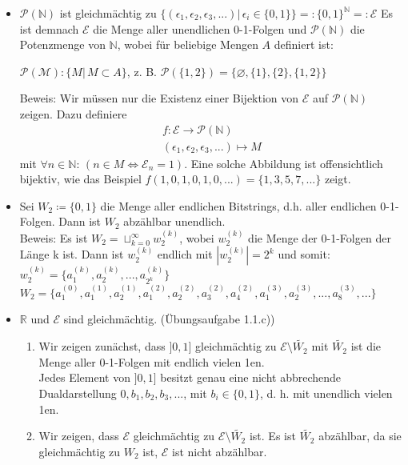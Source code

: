 \begin{itemize}[noitemsep]
\item $\mathcal{P(\mathbb{N})}$ ist gleichmächtig zu $\{(\epsilon_1, \epsilon_2, \epsilon_3, ...)| \, \epsilon_i \in \{0,1\}\} =: \{0,1\}^\mathbb{N} =: \mathcal{E}$
Es ist demnach $\mathcal{E}$ die Menge aller unendlichen 0-1-Folgen und $\mathcal{P(\mathbb{N})}$ die Potenzmenge von $\mathbb{N}$, wobei für beliebige Mengen $A$ definiert ist:
\begin{center}
	$\mathcal{P(M)}\colon \{M|\, M \subset A\}$, z. B. $\mathcal{P}( \{ 1, 2 \} ) = \{\varnothing, \{1\}, \{2\}, \{1,2\}\}$
\end{center}
Beweis: Wir müssen nur die Existenz einer Bijektion von $\mathcal{E}$ auf $\mathcal{P(\mathbb{N})}$ zeigen. Dazu definiere
\begin{equation*}
\begin{aligned}
	f: \mathcal{E} \to \mathcal{P(\mathbb{N})}\\
	(\epsilon_1, \epsilon_2, \epsilon_3, ...) \mapsto M
\end{aligned}
\end{equation*}
mit $\forall n \in \mathbb{N}: \, (n\in M \Leftrightarrow \mathcal{E}_n = 1)$. Eine solche Abbildung ist offensichtlich bijektiv, wie das Beispiel $f(1,0,1,0,1,0,...) = \{1,3,5,7,...\}$ zeigt. \proofend
\item Sei $W_2\coloneqq \{0,1\}$ die Menge aller endlichen Bitstrings, d.h. aller endlichen 0-1-Folgen. Dann ist $W_2$ abzählbar unendlich.\\
Beweis: Es ist $W_2 = \sqcup_{k=0}^\infty w_2^{(k)}$, wobei $w_2^{(k)}$ die Menge der 0-1-Folgen der Länge k ist. Dann ist $w_2^{(k)}$ endlich mit $|w_2^{(k)}|= 2^k$ und somit:\\
$w_2^{(k)} =\{a_1^{(k)}, a_2^{(k)}, ..., a_{2^k}^{(k)}\}$\\
$W_2 = \{a_1^{(0)}, a_1^{(1)}, a_2^{(1)}, a_1^{(2)}, a_2^{(2)}, a_3^{(2)}, a_4^{(2)}, a_1^{(3)}, a_2^{(3)},...,a_8^{(3)},...\}$
\item $\mathbb{R}$ und $\mathcal{E}$ sind gleichmächtig. (Übungsaufgabe 1.1.c))
\begin{enumerate}
	\item Wir zeigen zunächst, dass $]0,1]$ gleichmächtig zu $\mathcal{E}\setminus\widetilde{W_2}$ mit $\widetilde{W_2}$ ist die Menge aller 0-1-Folgen mit endlich vielen 1en.\\
	Jedes Element von $]0,1]$ besitzt genau eine nicht abbrechende Dualdarstellung $0,b_1, b_2,b_3,...$, mit $b_i \in \{0,1\}$, d. h. mit unendlich vielen 1en.
	\item Wir zeigen, dass $\mathcal{E}$ gleichmächtig zu $\mathcal{E}\setminus\widetilde{W_2}$ ist. Es ist $\widetilde{W_2}$ abzählbar, da sie gleichmächtig zu $W_2$ ist, $\mathcal{E}$ ist nicht abzählbar.\\

\end{enumerate}
\end{itemize}

